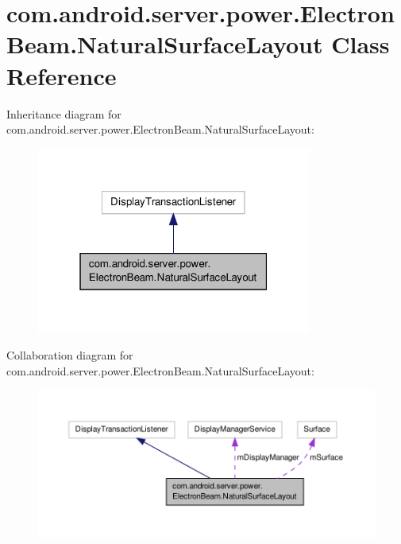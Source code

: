 \hypertarget{classcom_1_1android_1_1server_1_1power_1_1ElectronBeam_1_1NaturalSurfaceLayout}{\section{com.\-android.\-server.\-power.\-Electron\-Beam.\-Natural\-Surface\-Layout Class Reference}
\label{classcom_1_1android_1_1server_1_1power_1_1ElectronBeam_1_1NaturalSurfaceLayout}
}


Inheritance diagram for com.\-android.\-server.\-power.\-Electron\-Beam.\-Natural\-Surface\-Layout\-:
\nopagebreak
\begin{figure}[H]
\begin{center}
\leavevmode
\includegraphics[width=256pt]{classcom_1_1android_1_1server_1_1power_1_1ElectronBeam_1_1NaturalSurfaceLayout__inherit__graph}
\end{center}
\end{figure}


Collaboration diagram for com.\-android.\-server.\-power.\-Electron\-Beam.\-Natural\-Surface\-Layout\-:
\nopagebreak
\begin{figure}[H]
\begin{center}
\leavevmode
\includegraphics[width=350pt]{classcom_1_1android_1_1server_1_1power_1_1ElectronBeam_1_1NaturalSurfaceLayout__coll__graph}
\end{center}
\end{figure}
